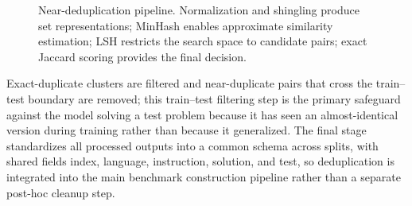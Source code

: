 \begin{figure}[t]
\centering
{}
\caption{Near-deduplication pipeline. Normalization and shingling produce set representations; MinHash enables approximate similarity estimation; LSH restricts the search space to candidate pairs; exact Jaccard scoring provides the final decision.}
\label{fig:near_dedup}
\end{figure}

Exact-duplicate clusters are filtered and near-duplicate pairs that cross the train--test boundary are removed; this train--test filtering step is the primary safeguard against the model solving a test problem because it has seen an almost-identical version during training rather than because it generalized. The final stage standardizes all processed outputs into a common schema across splits, with shared fields index, language, instruction, solution, and test, so deduplication is integrated into the main benchmark construction pipeline rather than a separate post-hoc cleanup step.

